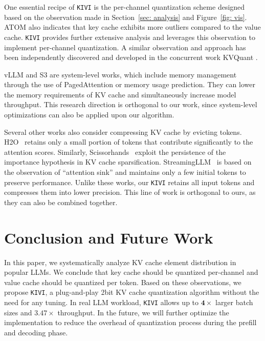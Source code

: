 One essential recipe of \texttt{KIVI} is the per-channel quantization scheme designed based on the observation made in Section~\ref{sec: analysis} and Figure~\ref{fig: vis}. ATOM \citep{zhao2024atom} also indicates that key cache exhibits more outliers compared to the value cache. \texttt{KIVI} provides further extensive analysis and leverages this observation to implement per-channel quantization. A similar observation and approach has been independently discovered and developed in the concurrent work KVQuant \citep{hooper2024kvquant}.

vLLM \citep{vllm} and S3 \citep{jin2023s} are system-level works, which include memory management through the use of PagedAttention or memory usage prediction. They can lower the memory requirements of KV cache and simultaneously increase model throughput. This research direction is orthogonal to our work, since system-level optimizations can also be applied upon our algorithm.

Several other works also consider compressing KV cache by evicting tokens. H2O~\citep{h2o} retains only a small portion of tokens that contribute significantly to the attention scores. Similarly, Scissorhands~\citep{liu2024scissorhands} exploit the persistence of the importance hypothesis in KV cache sparsification. StreamingLLM~\citep{xiao2023efficient} is based on the observation of ``attention sink'' and maintains only a few initial tokens to preserve performance. Unlike these works, our \texttt{KIVI} retains all input tokens and compresses them into lower precision. This line of work is orthogonal to ours, as they can also be combined together.

\section{Conclusion and Future Work}

In this paper, we systematically analyze KV cache element distribution in popular LLMs. We conclude that key cache should be quantized per-channel and value cache should be quantized per token. Based on these observations, we propose \texttt{KIVI}, a plug-and-play 2bit KV cache quantization algorithm without the need for any tuning. In real LLM workload, \texttt{KIVI} allows up to $\mathbf{4\times}$ larger batch sizes and $\mathbf{3.47\times}$ throughput. In the future, we will further optimize the implementation to reduce the overhead of quantization process during the prefill and decoding phase.


